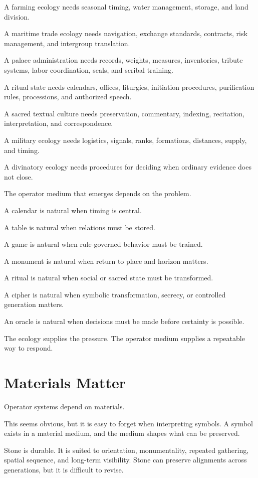 \documentclass[11pt]{book}
\begin{document}
A farming ecology needs seasonal timing, water management, storage, and land division.

A maritime trade ecology needs navigation, exchange standards, contracts, risk management, and intergroup translation.

A palace administration needs records, weights, measures, inventories, tribute systems, labor coordination, seals, and scribal training.

A ritual state needs calendars, offices, liturgies, initiation procedures, purification rules, processions, and authorized speech.

A sacred textual culture needs preservation, commentary, indexing, recitation, interpretation, and correspondence.

A military ecology needs logistics, signals, ranks, formations, distances, supply, and timing.

A divinatory ecology needs procedures for deciding when ordinary evidence does not close.

The operator medium that emerges depends on the problem.

A calendar is natural when timing is central.

A table is natural when relations must be stored.

A game is natural when rule-governed behavior must be trained.

A monument is natural when return to place and horizon matters.

A ritual is natural when social or sacred state must be transformed.

A cipher is natural when symbolic transformation, secrecy, or controlled generation matters.

An oracle is natural when decisions must be made before certainty is possible.

The ecology supplies the pressure. The operator medium supplies a repeatable way to respond.

\section{Materials Matter}

Operator systems depend on materials.

This seems obvious, but it is easy to forget when interpreting symbols. A symbol exists in a material medium, and the medium shapes what can be preserved.

Stone is durable. It is suited to orientation, monumentality, repeated gathering, spatial sequence, and long-term visibility. Stone can preserve alignments across generations, but it is difficult to revise.
\end{document}
